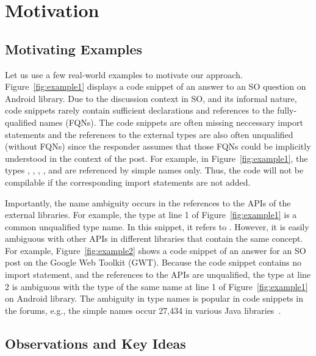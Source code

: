 \section{Motivation}
\label{motiv:sec}

\subsection{Motivating Examples}
\label{examples:sec}



Let us use a few real-world examples to motivate our approach.
Figure~\ref{fig:example1} displays a code snippet of an answer to an
SO question on Android library. Due to the discussion context in SO,
and its informal nature, code snippets rarely contain sufficient
declarations and references to the fully-qualified names (FQNs). The
code snippets are often missing neccessary import statements and the
references to the external types are also often unqualified (without
FQNs) since the responder assumes that those FQNs could be implicitly
understood in the context of the post. For example, in
Figure~\ref{fig:example1}, the types , ,
, , and  are referenced by simple
names only. Thus, the code will not be compilable if the corresponding
import statements are not added.



Importantly, the name ambiguity occurs in the references to the APIs
of the external libraries. For example, the type  at line
1 of Figure~\ref{fig:example1} is a common unqualified type name. In
this snippet, it refers to . However, it
is easily ambiguous with other APIs in different libraries that
contain the same concept. For example, Figure~\ref{fig:example2} shows
a code snippet of an answer for an SO post on the Google Web Toolkit
(GWT). Because the code snippet contains no import statement, and the
references to the APIs are unqualified, the type  at line
2 is ambiguous with the type of the same name at line 1 of
Figure~\ref{fig:example1} on Android library. The ambiguity in type
names is popular in code snippets in the forums, e.g., the
simple names  occur 27,434 in various Java
libraries~\cite{liveapi14}.

\subsection{Observations and Key Ideas}
\label{sec:key-ideas}

